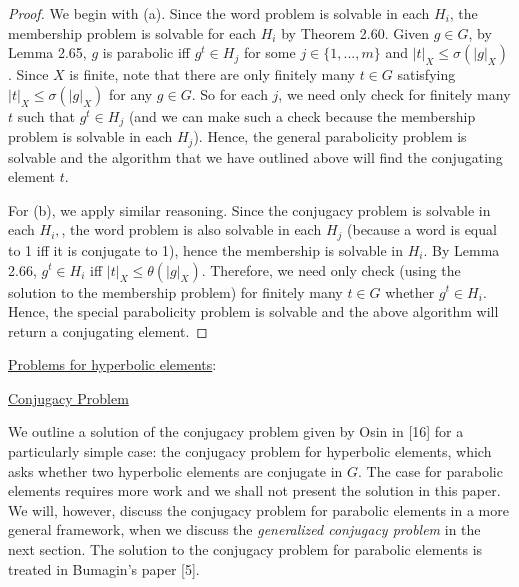 \documentclass[12pt]{article}
\newcommand{\vs}{\vskip10pt}
\begin{document}
	\begin{proof}
		
		We begin with (a). Since the word problem is solvable in each $H_i$, the membership problem is solvable for each $H_i$ by Theorem 2.60. Given $g \in G$, by Lemma 2.65, $g$ is parabolic iff $g^t \in H_j$ for some $j \in \{1,...,m\}$ and $\vert t \vert_X \leq \sigma(\vert g \vert_X)$. Since $X$ is finite, note that there are only finitely many $t \in G$ satisfying $\vert t \vert_X \leq \sigma(\vert g \vert_X)$ for any $g \in G$. So for each $j$, we need only check for finitely many $t$ such that $g^t \in H_j$ (and we can make such a check because the membership problem is solvable in each $H_j$). Hence, the general parabolicity problem is solvable and the algorithm that we have outlined above will find the conjugating element $t$. 
		
		\vs 
		
		For (b), we apply similar reasoning. Since the conjugacy problem is solvable in each $H_i, $, the word problem is also solvable in each $H_j$ (because a word is equal to 1 iff it is conjugate to 1), hence the membership is solvable in $H_i$. By Lemma 2.66, $g^t \in H_i$ iff $\vert t \vert_X \leq \theta(\vert g \vert_X)$. Therefore, we need only check (using the solution to the membership problem) for finitely many $t \in G$ whether $g^t \in H_i$. Hence, the special parabolicity problem is solvable and the above algorithm will return a conjugating element.
		
	\end{proof}
	
	\vs 
	
	\underline{Problems for hyperbolic elements}: 
	
	\vs 
	
	\underline{Conjugacy Problem}
	
	\vs 
	
	We outline a solution of the conjugacy problem given by Osin in [16] for a particularly simple case: the conjugacy problem for hyperbolic elements, which asks whether two hyperbolic elements are conjugate in $G$. The case for parabolic elements requires more work and we shall not present the solution in this paper. We will, however, discuss the conjugacy problem for parabolic elements in a more general framework, when we discuss the \textit{generalized conjugacy problem} in the next section. The solution to the conjugacy problem for parabolic elements is treated in Bumagin's paper [5]. 
	
	\vs 
	
\end{document}
